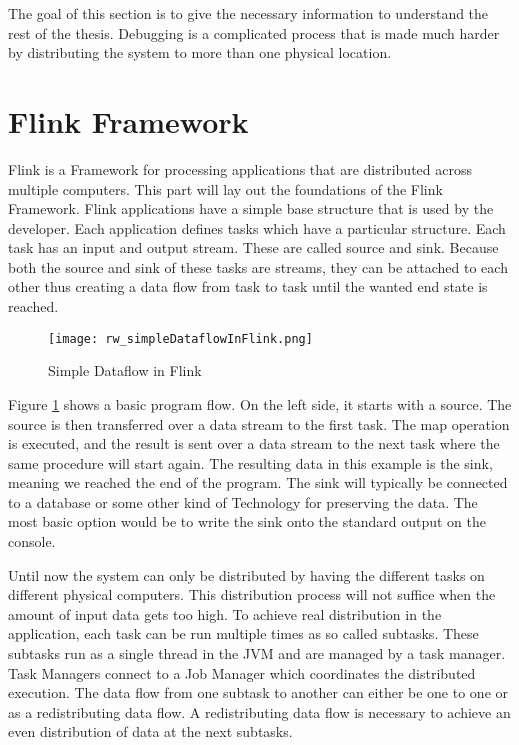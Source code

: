 The goal of this section is to give the necessary information to understand the rest of the thesis. Debugging is a complicated process that is made much harder by distributing the system to more than one physical location.

\section{Flink Framework}
\label{flinkFramework}

Flink is a Framework for processing applications that are distributed across multiple computers. This part will lay out the foundations of the Flink Framework.
Flink applications have a simple base structure that is used by the developer. Each application defines tasks which have a particular structure. Each task has an input and output stream. These are called source and sink. Because both the source and sink of these tasks are streams, they can be attached to each other thus creating a data flow from task to task until the wanted end state is reached.

\begin{figure}[h!]
    \centering
      \texttt{[image: rw\_simpleDataflowInFlink.png]}
      \caption{Simple Dataflow in Flink}
      \label{simpleDataflowInFlink}
\end{figure}

Figure \ref{simpleDataflowInFlink} shows a basic program flow. On the left side, it starts with a source. The source is then transferred over a data stream to the first task. The map operation is executed, and the result is sent over a data stream to the next task where the same procedure will start again. The resulting data in this example is the sink, meaning we reached the end of the program. The sink will typically be connected to a database or some other kind of Technology for preserving the data. The most basic option would be to write the sink onto the standard output on the console.

Until now the system can only be distributed by having the different tasks on different physical computers. This distribution process will not suffice when the amount of input data gets too high. To achieve real distribution in the application, each task can be run multiple times as so called subtasks. These subtasks run as a single thread in the JVM and are managed by a task manager. Task Managers connect to a Job Manager which coordinates the distributed execution. The data flow from one subtask to another can either be one to one or as a redistributing data flow. A redistributing data flow is necessary to achieve an even distribution of data at the next subtasks.

